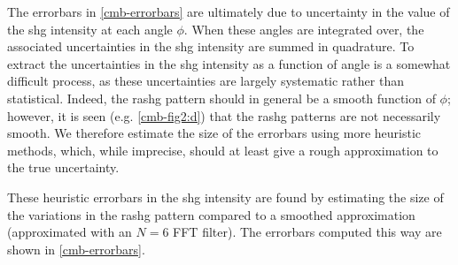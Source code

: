 The errorbars in \cref{cmb-errorbars} are ultimately due to uncertainty in the value of the \gls{shg} intensity at each angle $\phi$.
When these angles are integrated over, the associated uncertainties in the \gls{shg} intensity are summed in quadrature.
To extract the uncertainties in the \gls{shg} intensity as a function of angle is a somewhat difficult process, as these uncertainties are largely systematic rather than statistical.
Indeed, the \gls{rashg} pattern should in general be a smooth function of $\phi$; however, it is seen (e.g. \cref{cmb-fig2:d}) that the \gls{rashg} patterns are not necessarily smooth.
We therefore estimate the size of the errorbars using more heuristic methods, which, while imprecise, should at least give a rough approximation to the true uncertainty.

These heuristic errorbars in the \gls{shg} intensity are found by estimating the size of the variations in the \gls{rashg} pattern compared to a smoothed approximation (approximated with an $N=6$ FFT filter).
The errorbars computed this way are shown in \cref{cmb-errorbars}.

